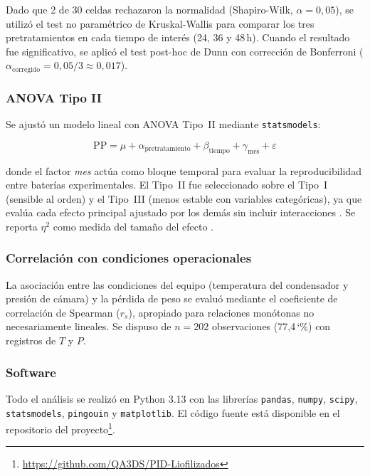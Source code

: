 \documentclass[12pt, a4paper]{article}
\newcommand{\pct}{\char`\%}
\begin{document}
Dado que 2 de 30 celdas rechazaron la normalidad (Shapiro-Wilk, $\alpha = 0{,}05$), se utilizó el test no paramétrico de Kruskal-Wallis \citep{kruskal1952} para comparar los tres pretratamientos en cada tiempo de interés (24, 36 y 48\,h). Cuando el resultado fue significativo, se aplicó el test post-hoc de Dunn con corrección de Bonferroni ($\alpha_{\text{corregido}} = 0{,}05/3 \approx 0{,}017$).

\subsubsection{ANOVA Tipo II}

Se ajustó un modelo lineal con ANOVA Tipo~II \citep{fox2008} mediante \texttt{statsmodels}:

\begin{equation}
    \text{PP} = \mu + \alpha_{\text{pretratamiento}} + \beta_{\text{tiempo}} + \gamma_{\text{mes}} + \varepsilon
    \label{eq:anova}
\end{equation}

\noindent donde el factor \textit{mes} actúa como bloque temporal para evaluar la reproducibilidad entre baterías experimentales. El Tipo~II fue seleccionado sobre el Tipo~I (sensible al orden) y el Tipo~III (menos estable con variables categóricas), ya que evalúa cada efecto principal ajustado por los demás sin incluir interacciones \citep{fox2008}. Se reporta $\eta^2$ como medida del tamaño del efecto \citep{cohen1988}.

\subsubsection{Correlación con condiciones operacionales}

La asociación entre las condiciones del equipo (temperatura del condensador y presión de cámara) y la pérdida de peso se evaluó mediante el coeficiente de correlación de Spearman ($r_s$), apropiado para relaciones monótonas no necesariamente lineales. Se dispuso de $n = 202$ observaciones (77{,}4\,\pct{}) con registros de $T$ y $P$.

\subsubsection{Software}

Todo el análisis se realizó en Python 3.13 con las librerías \texttt{pandas}, \texttt{numpy}, \texttt{scipy}, \texttt{statsmodels}, \texttt{pingouin} y \texttt{matplotlib}. El código fuente está disponible en el repositorio del proyecto\footnote{\url{https://github.com/QA3DS/PID-Liofilizados}}.
\end{document}
